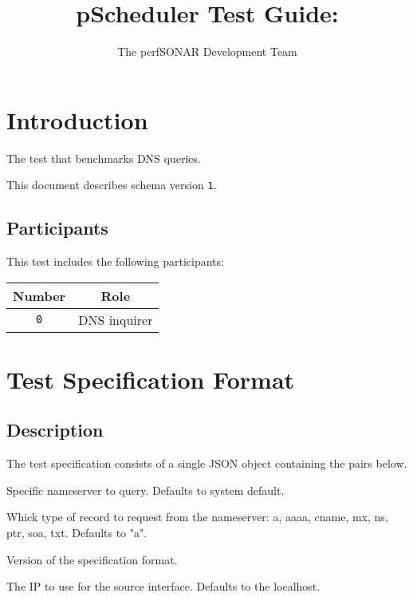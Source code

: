 \documentclass[10pt]{article}
\title{pScheduler Test Guide: {\it \testname}}
\author{The perfSONAR Development Team}
\begin{document}
\maketitle


%
%

\section{Introduction}

The {\tt \testname} test that benchmarks DNS queries.

This document describes schema version {\tt 1}.

\subsection{Participants}

This test includes the following participants:

\begin{center}
\begin{tabular}{|c|c|}
\hline
{\bf Number} & {\bf Role} \\
\hline
{\tt 0} & DNS inquirer \\
\hline
\end{tabular}
\end{center}



%
%

\section{Test Specification Format}

\subsection{Description}

The test specification consists of a single JSON object containing the
pairs below.  \seejson


 Specific nameserver to query.  Defaults to
system default.

 Whick type of record to request from the
nameserver: a, aaaa, cname, mx, ns, ptr, soa, txt.  Defaults to "a".

 Version of the specification format.

 The IP to use for the source interface.  Defaults
to the localhost.
\end{document}
